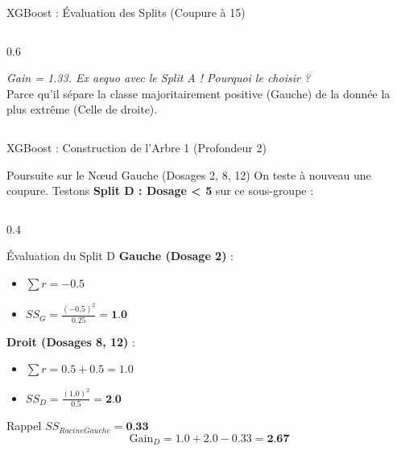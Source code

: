 \begin{frame}{XGBoost : Évaluation des Splits (Coupure à 15)}
\begin{columns}[T]
\begin{column}{0.6\textwidth}
\begin{center}
            
            \vspace{0.2cm}
            \scriptsize \textit{Gain = 1.33. Ex aequo avec le Split A ! Pourquoi le choisir ?} \\
            Parce qu'il sépare la classe majoritairement positive (Gauche) de la donnée la plus extrême (Celle de droite).
            \end{center}
        \end{column}
    \end{columns}
\end{frame}

\begin{frame}{XGBoost : Construction de l'Arbre 1 (Profondeur 2)}
    \vspace{-0.2cm}
    \begin{block}{Poursuite sur le Nœud Gauche (Dosages 2, 8, 12)}
        \scriptsize
        On teste à nouveau une coupure. Testons \textbf{Split D : Dosage < 5} sur ce sous-groupe :
    \end{block}
    
    \begin{columns}[T]
        \begin{column}{0.4\textwidth}
            \begin{block}{Évaluation du Split D}
                \scriptsize
                \textbf{Gauche (Dosage 2)} :
                \begin{itemize}
                    \setlength\itemsep{0em}
                    \item $\sum r = -0.5$
                    \item $SS_{G} = \frac{(-0.5)^2}{0.25} = \textbf{1.0}$
                \end{itemize}
                
                \textbf{Droit (Dosages 8, 12)} :
                \begin{itemize}
                    \setlength\itemsep{0em}
                    \item $\sum r = 0.5 + 0.5 = 1.0$
                    \item $SS_{D} = \frac{(1.0)^2}{0.5} = \textbf{2.0}$
                \end{itemize}
                
                Rappel $SS_{Racine Gauche} = \textbf{0.33}$
                $$ \text{Gain}_D = 1.0 + 2.0 - 0.33 = \textbf{2.67} $$
            \end{block}
        \end{column}
        

\end{columns}
\end{frame}
